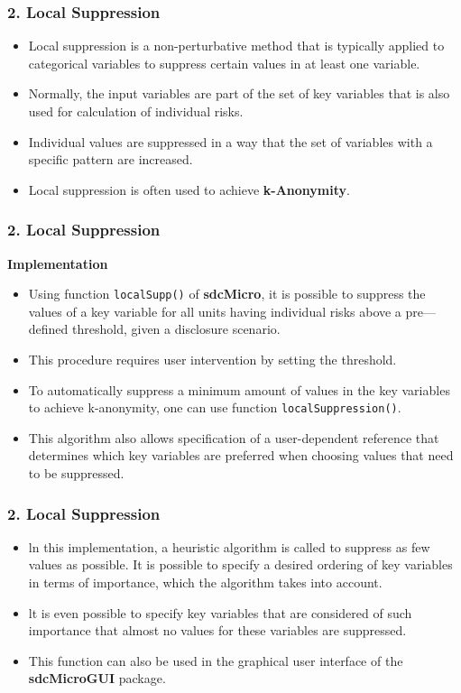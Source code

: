 \documentclass{beamer}
\begin{document}
\begin{frame}
	\frametitle{2. Local Suppression}
	\begin{itemize}
\item Local suppression is a non-perturbative method that is typically applied to categorical variables to suppress certain values in at least one variable. 
\item Normally, the
input variables are part of the set of key variables that is also used for calculation
of individual risks. %

\item Individual values are suppressed
in a way that the set of variables with a specific pattern are increased.
\item Local
suppression is often used to achieve \textbf{k-Anonymity}. %
\end{itemize}
\end{frame}
\begin{frame}
	\frametitle{2. Local Suppression}
\textbf{Implementation}
	\begin{itemize}
		\item Using function \texttt{localSupp()} of \textbf{sdcMicro}, it is possible to suppress the values of
a key variable for all units having individual risks above a pre—deﬁned threshold,
given a disclosure scenario. 


\item This procedure requires user intervention by setting
the threshold. 
\item To automatically suppress a minimum amount of values in the key
variables to achieve k-anonymity, one can use function \texttt{localSuppression()}.
\item This
algorithm also allows specification of a user-dependent reference that determines
which key variables are preferred when choosing values that need to be suppressed.
\end{itemize}
\end{frame}
\begin{frame}
	\frametitle{2. Local Suppression}
	\begin{itemize}
\item ln this implementation, a heuristic algorithm is called to suppress as few values
as possible. It is possible to specify a desired ordering of key variables in terms of
importance, which the algorithm takes into account. 
\item lt is even possible to specify
key variables that are considered of such importance that almost no values for
these variables are suppressed.
\item This function can also be used in the graphical
user interface of the \textbf{sdcMicroGUI} package.
\end{itemize}
\end{frame}
\end{document}
